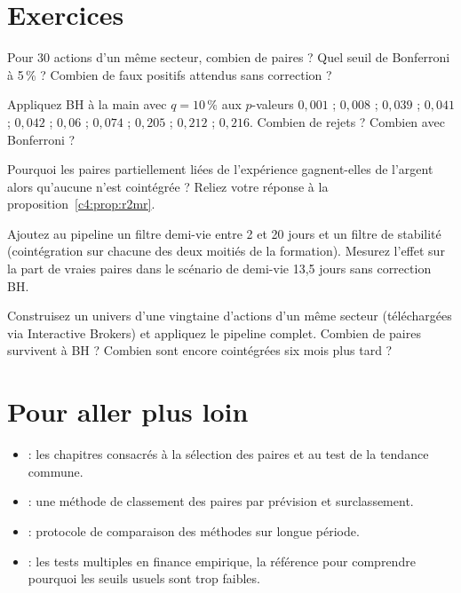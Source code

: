 \section{Exercices}

\begin{exercise}
Pour 30 actions d'un même secteur, combien de paires ? Quel seuil de Bonferroni à 5\,\% ? Combien de faux positifs attendus sans correction ?
\end{exercise}

\begin{exercise}
Appliquez BH à la main avec $q = 10\,\%$ aux $p$-valeurs $0{,}001$ ; $0{,}008$ ; $0{,}039$ ; $0{,}041$ ; $0{,}042$ ; $0{,}06$ ; $0{,}074$ ; $0{,}205$ ; $0{,}212$ ; $0{,}216$. Combien de rejets ? Combien avec Bonferroni ?
\end{exercise}

\begin{exercise}
Pourquoi les paires partiellement liées de l'expérience gagnent-elles de l'argent alors qu'aucune n'est cointégrée ? Reliez votre réponse à la proposition~\ref{c4:prop:r2mr}.
\end{exercise}

\begin{exercise}[à coder]
Ajoutez au pipeline un filtre \og demi-vie entre 2 et 20 jours\fg{} et un filtre de stabilité (cointégration sur chacune des deux moitiés de la formation). Mesurez l'effet sur la part de vraies paires dans le scénario de demi-vie 13,5 jours sans correction BH.
\end{exercise}

\begin{exercise}
Construisez un univers d'une vingtaine d'actions d'un même secteur (téléchargées via Interactive Brokers) et appliquez le pipeline complet. Combien de paires survivent à BH ? Combien sont encore cointégrées six mois plus tard ?
\end{exercise}

\section{Pour aller plus loin}

\begin{toread}
\begin{itemize}[leftmargin=1.2em]
\item \citet{vidyamurthy2004} : les chapitres consacrés à la sélection des paires et au test de la tendance commune.
\item \citet{huck2009} : une méthode de classement des paires par prévision et surclassement.
\item \citet{rad2016} : protocole de comparaison des méthodes sur longue période.
\item \citet{harvey2016} : les tests multiples en finance empirique, la référence pour comprendre pourquoi les seuils usuels sont trop faibles.
\end{itemize}
\end{toread}

